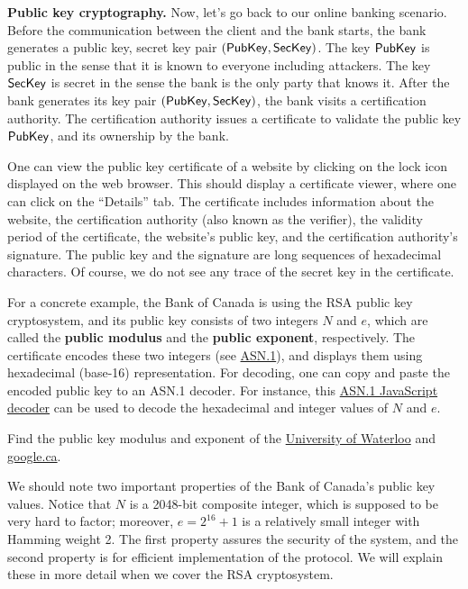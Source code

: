 {\bf Public key cryptography.} Now, let’s go back to our online banking scenario. Before the communication between the client and the bank starts, the bank generates a public key, secret key pair $({\sf PubKey}, {\sf SecKey})$. The key ${\sf PubKey}$ is public in the sense that it is known to everyone including attackers. The key ${\sf SecKey}$ is secret in the sense the bank is the only party that knows it. After the bank generates its key pair $({\sf PubKey}, {\sf SecKey})$, the bank visits a certification authority. The certification authority issues a certificate to validate the public key ${\sf PubKey}$, and its ownership by the bank.

One can view the public key certificate of a website by clicking on the lock icon displayed on the 
web browser. This should display a certificate viewer, where one can click on the ``Details'' tab. 
The certificate includes information about the website, the certification authority (also known as the verifier), the validity period of the certificate, the website’s public key, and the certification authority’s signature. The public key and the signature are long sequences of hexadecimal characters.
Of course, we do not see any trace of the secret key in the certificate.

For a concrete example, the Bank of Canada is using the RSA public key cryptosystem, and its public key consists of two integers $N$ and $e$, which are called the {\bf public modulus} and the {\bf public exponent}, respectively. The certificate encodes these two integers (see \href{https://en.wikipedia.org/wiki/ASN.1}{ASN.1}), and displays them using hexadecimal (base-16) representation. For decoding, one can copy and paste the encoded public key to an ASN.1 decoder. For instance, this \href{https://lapo.it/asn1js/}{ASN.1 JavaScript decoder} can be used to decode the hexadecimal and integer values of $N$ and $e$.

\begin{exercise*}
Find the public key modulus and exponent of the \href{https://uwaterloo.ca/}{University of Waterloo} and \href{https://google.ca}{google.ca}.
\end{exercise*}

We should note two important properties of the Bank of Canada’s public key values. 
Notice that $N$ is a 2048-bit composite integer, which is supposed to be very hard to factor; 
moreover, $e=2^{16}+1$ is a relatively small integer with Hamming weight 2. The first property assures the security of the system, and the second property is for efficient implementation of the protocol. We will explain these in more detail when we cover the RSA cryptosystem.

